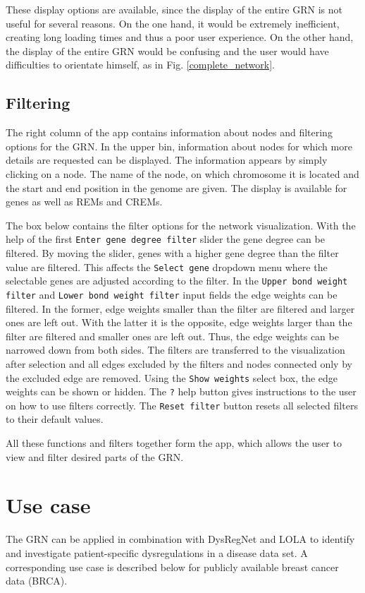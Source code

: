 \documentclass[pdftex,12pt,a4paper]{report}
\begin{document}
These display options are available, since the display of the entire GRN is not useful for several reasons. On the one hand, it would be extremely inefficient, creating long loading times and thus a poor user experience. On the other hand, the display of the entire GRN would be confusing and the user would have difficulties to orientate himself, as in Fig. \ref{complete_network}. 

\subsection{Filtering}
The right column of the app contains information about nodes and filtering options for the GRN. 
In the upper bin, information about nodes for which more details are requested can be displayed. The information appears by simply clicking on a node. The name of the node, on which chromosome it is located and the start and end position in the genome are given. The display is available for genes as well as REMs and CREMs. 

The box below contains the filter options for the network visualization. With the help of the first \texttt{Enter gene degree filter} slider the gene degree can be filtered. By moving the slider, genes with a higher gene degree than the filter value are filtered. This affects the \texttt{Select gene} dropdown menu where the selectable genes are adjusted according to the filter. In the \texttt{Upper bond weight filter} and \texttt{Lower bond weight filter} input fields the edge weights can be filtered. In the former, edge weights smaller than the filter are filtered and larger ones are left out. With the latter it is the opposite, edge weights larger than the filter are filtered and smaller ones are left out. Thus, the edge weights can be narrowed down from both sides. The filters are transferred to the visualization after selection and all edges excluded by the filters and nodes connected only by the excluded edge are removed. Using the \texttt{Show weights} select box, the edge weights can be shown or hidden. The \texttt{?} help button gives instructions to the user on how to use filters correctly. The \texttt{Reset filter} button resets all selected filters to their default values. 

All these functions and filters together form the app, which allows the user to view and filter desired parts of the GRN.  

\section{Use case}
The GRN can be applied in combination with DysRegNet and LOLA to identify and investigate patient-specific dysregulations in a disease data set. A corresponding use case is described below for publicly available breast cancer data (BRCA).
\end{document}

